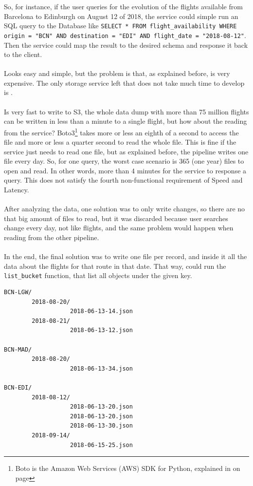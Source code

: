 So, for instance, if the user queries for the evolution of the flights available from Barcelona to Edinburgh on August 12 of 2018, the service could simple run an SQL query to the Database like \texttt{SELECT * FROM flight\_availability WHERE origin = "BCN" AND destination = "EDI" AND flight\_date = "2018-08-12"}. Then the service could map the result to the desired schema and response it back to the client.
\\\\
Looks easy and simple, but the problem is that, as explained before,  is very expensive. The only storage service left that does not take much time to develop is .
\\\\
Is very fast to write to S3, the whole data dump with more than 75 million flights can be written in less than a minute to a single flight, but how about the reading from the service? Boto3\footnote{Boto\cite{boto3} is the Amazon Web Services (AWS) SDK for Python, explained in  on page \pageref{boto3}} takes more or less an eighth of a second to access the file and more or less a quarter second to read the whole file. This is fine if the service just needs to read one file, but as explained before, the pipeline writes one file every day. So, for one query, the worst case scenario is 365 (one year) files to open and read. In other words, more than 4 minutes for the service to response a query. This does not satisfy the fourth non-functional requirement of Speed and Latency.
\\\\
After analyzing the data, one solution was to only write changes, so there are no that big amount of files to read, but it was discarded because user searches change every day, not like flights, and the same problem would happen when reading from the other pipeline.
\\\\
In the end, the final solution was to write one file per record, and inside it all the data about the flights for that route in that date. That way,  could run the \texttt{list\_bucket} function, that list all objects under the given key.

\begin{verbatim}
BCN-LGW/
        2018-08-20/
                   2018-06-13-14.json
        2018-08-21/
                   2018-06-13-12.json

BCN-MAD/
        2018-08-20/
                   2018-06-13-34.json

BCN-EDI/
        2018-08-12/
                   2018-06-13-20.json
                   2018-06-13-20.json
                   2018-06-13-30.json
        2018-09-14/
                   2018-06-15-25.json
\end{verbatim}

